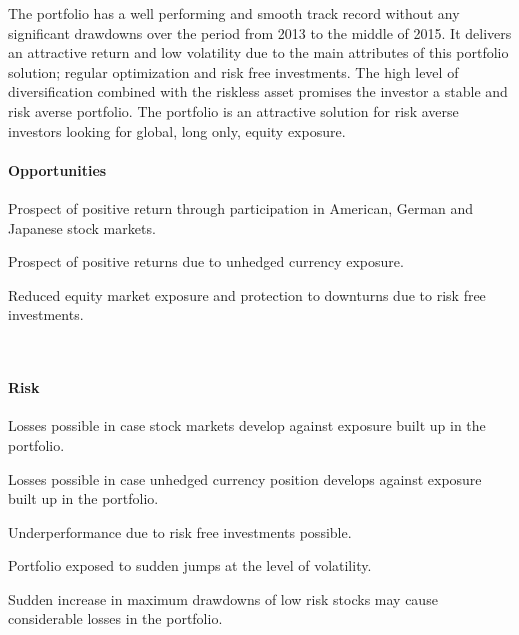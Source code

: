 \documentclass[11pt, parskip=full, DIV=14]{scrreprt}
\begin{document}
The portfolio has a well performing and smooth track record without any significant drawdowns over the period from 2013 to the middle of 2015.
It delivers an attractive return and low volatility due to the main attributes of this portfolio solution; regular optimization and risk free investments.
The high level of diversification combined with the riskless asset promises the investor a stable and risk averse portfolio.
The portfolio is an attractive solution for risk averse investors looking for global, long only, equity exposure.
 

\begin{minipage}[t]{0.49\textwidth}
  \paragraph{Opportunities}
  \begin{sit}
    \item Prospect of positive return through participation in American, German and Japanese stock markets.
    \item Prospect of positive returns due to unhedged currency exposure.
    \item Reduced equity market exposure and protection to downturns due to risk free investments.
  \end{sit}
\end{minipage}
~~
\begin{minipage}[t]{0.49\textwidth}
  \paragraph{Risk}
  \begin{sit}
    \item Losses possible in case stock markets develop against exposure built up in the portfolio.
    \item Losses possible in case unhedged currency position develops against exposure built up in the portfolio.
    \item Underperformance due to risk free investments possible.
    \item Portfolio exposed to sudden jumps at the level of volatility.
    \item Sudden increase in maximum drawdowns of low risk stocks may cause considerable losses in the portfolio.
  \end{sit}
\end{minipage}
\end{document}
